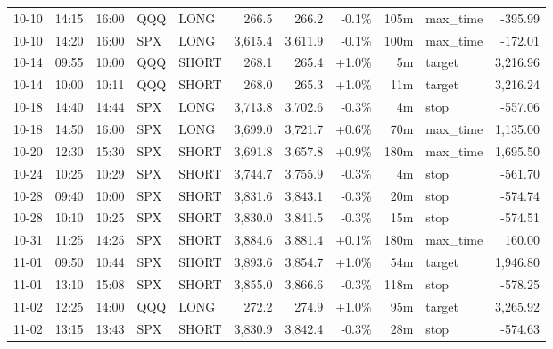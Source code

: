 \documentclass[11pt,a4paper,twoside]{article}
\begin{document}
\begin{center}
\begin{longtable}{>{\color{txtmain}}l l l l l r r r r >{\color{txtmain}}l r}
10-10 & 14:15 & 16:00 & QQQ & LONG & 266.5 & 266.2 & \textcolor{lossred}{-0.1\%} & 105m & max\_time & \textcolor{lossred}{-395.99} \\
10-10 & 14:20 & 16:00 & SPX & LONG & 3,615.4 & 3,611.9 & \textcolor{lossred}{-0.1\%} & 100m & max\_time & \textcolor{lossred}{-172.01} \\
10-14 & 09:55 & 10:00 & QQQ & SHORT & 268.1 & 265.4 & \textcolor{wingreen}{+1.0\%} & 5m & target & \textcolor{wingreen}{3,216.96} \\
10-14 & 10:00 & 10:11 & QQQ & SHORT & 268.0 & 265.3 & \textcolor{wingreen}{+1.0\%} & 11m & target & \textcolor{wingreen}{3,216.24} \\
10-18 & 14:40 & 14:44 & SPX & LONG & 3,713.8 & 3,702.6 & \textcolor{lossred}{-0.3\%} & 4m & stop & \textcolor{lossred}{-557.06} \\
10-18 & 14:50 & 16:00 & SPX & LONG & 3,699.0 & 3,721.7 & \textcolor{wingreen}{+0.6\%} & 70m & max\_time & \textcolor{wingreen}{1,135.00} \\
10-20 & 12:30 & 15:30 & SPX & SHORT & 3,691.8 & 3,657.8 & \textcolor{wingreen}{+0.9\%} & 180m & max\_time & \textcolor{wingreen}{1,695.50} \\
10-24 & 10:25 & 10:29 & SPX & SHORT & 3,744.7 & 3,755.9 & \textcolor{lossred}{-0.3\%} & 4m & stop & \textcolor{lossred}{-561.70} \\
10-28 & 09:40 & 10:00 & SPX & SHORT & 3,831.6 & 3,843.1 & \textcolor{lossred}{-0.3\%} & 20m & stop & \textcolor{lossred}{-574.74} \\
10-28 & 10:10 & 10:25 & SPX & SHORT & 3,830.0 & 3,841.5 & \textcolor{lossred}{-0.3\%} & 15m & stop & \textcolor{lossred}{-574.51} \\
10-31 & 11:25 & 14:25 & SPX & SHORT & 3,884.6 & 3,881.4 & \textcolor{wingreen}{+0.1\%} & 180m & max\_time & \textcolor{wingreen}{160.00} \\
11-01 & 09:50 & 10:44 & SPX & SHORT & 3,893.6 & 3,854.7 & \textcolor{wingreen}{+1.0\%} & 54m & target & \textcolor{wingreen}{1,946.80} \\
11-01 & 13:10 & 15:08 & SPX & SHORT & 3,855.0 & 3,866.6 & \textcolor{lossred}{-0.3\%} & 118m & stop & \textcolor{lossred}{-578.25} \\
11-02 & 12:25 & 14:00 & QQQ & LONG & 272.2 & 274.9 & \textcolor{wingreen}{+1.0\%} & 95m & target & \textcolor{wingreen}{3,265.92} \\
11-02 & 13:15 & 13:43 & SPX & SHORT & 3,830.9 & 3,842.4 & \textcolor{lossred}{-0.3\%} & 28m & stop & \textcolor{lossred}{-574.63} \\

\end{longtable}
\end{center}
\end{document}
